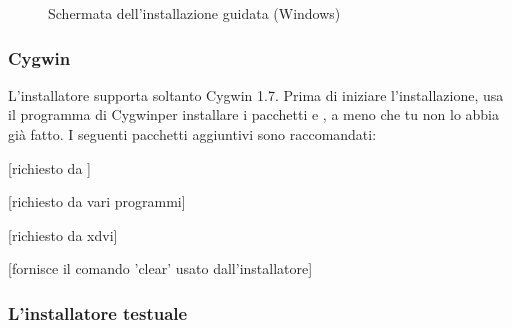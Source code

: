 \documentclass{article}
\begin{document}
\begin{figure}[tb]
\caption{Schermata dell'installazione guidata (Windows)}\label{fig:wizard}
\end{figure}


\subsubsection{Cygwin}
\label{sec:cygwin}

L'installatore \TL{} supporta soltanto Cygwin 1.7.
Prima di iniziare l'installazione, usa il programma 
di Cygwinper installare i pacchetti  e , a
meno che tu non lo abbia già fatto. I seguenti pacchetti aggiuntivi sono
raccomandati:
\begin{itemize*}
\item {} [richiesto da \XeTeX]
\item {} [richiesto da vari programmi]
\item {} [richiesto da xdvi]
\item {} [fornisce il comando 'clear' usato
  dall'installatore]
\end{itemize*}

\subsubsection{L'installatore testuale}
\end{document}
